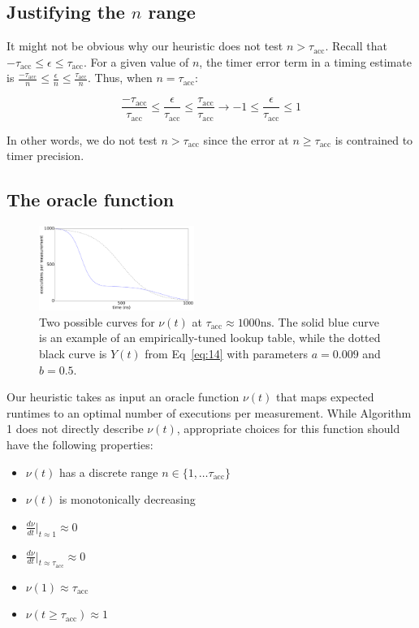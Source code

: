 \documentclass[conference]{IEEEtran}
\begin{document}
\subsection{Justifying the $n$ range}

It might not be obvious why our heuristic does not test $n > \tau_{\textrm{acc}}$. Recall
that $-\tau_{\textrm{acc}} \le \epsilon \le \tau_{\textrm{acc}}$. For a given value of $n$,
the timer error term in a timing estimate is $\frac{-\tau_{\textrm{acc}}}{n} \le
\frac{\epsilon}{n} \le \frac{\tau_{\textrm{acc}}}{n}$. Thus, when $n = \tau_{\textrm{acc}}$:

\begin{equation}
\frac{-\tau_{\textrm{acc}}}{\tau_{\textrm{acc}}} \le \frac{\epsilon}{\tau_{\textrm{acc}}} \le \frac{\tau_{\textrm{acc}}}{\tau_{\textrm{acc}}} \to -1 \le \frac{\epsilon}{\tau_{\textrm{acc}}} \le 1
\end{equation}

In other words, we do not test $n > \tau_{\textrm{acc}}$ since the error at $n \ge
\tau_{\textrm{acc}}$ is contrained to timer precision.

\subsection{The oracle function}

\begin{figure}
\centering
\includegraphics[width=0.45\textwidth]{figures/fig5/oracle}
\caption{Two possible curves for $\nu(t)$ at $\tau_{\textrm{acc}} \approx 1000 \textrm{ns}$.
The solid blue curve is an example of an empirically-tuned lookup table, while the dotted
black curve is $Y(t)$ from Eq~\ref{eq:14} with parameters $a = 0.009$ and $b = 0.5$.}
\label{fig:scaling}
\end{figure}

Our heuristic takes as input an oracle function $\nu(t)$ that maps expected runtimes to an
optimal number of executions per measurement. While Algorithm 1 does not directly describe
$\nu(t)$, appropriate choices for this function should have the following properties:

\begin{itemize}
    \item $\nu(t)$ has a discrete range $n \in \{1, \dots \tau_{\textrm{acc}}\}$
    \item $\nu(t)$ is monotonically decreasing
    \item $\frac{d\nu}{dt}|_{t \approx 1} \approx 0$
    \item $\frac{d\nu}{dt}|_{t \approx \tau_{\textrm{acc}}} \approx 0$
    \item $\nu(1) \approx \tau_{\textrm{acc}}$
    \item $\nu(t \ge \tau_{\textrm{acc}}) \approx 1$
\end{itemize}
\end{document}
